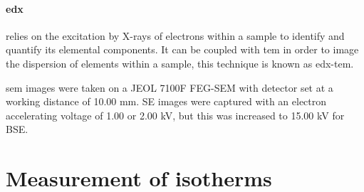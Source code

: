 \paragraph{\acrfull{edx}} relies on the excitation by X-rays of electrons within a sample to identify and quantify its elemental components. It can be coupled with \acrshort{tem} in order to image the dispersion of elements within a sample, this technique is known as \acrshort{edx}-\acrshort{tem}.\citep{Goldstein2017Scanning}

\par \acrshort{sem} images were taken on a JEOL 7100F FEG-SEM with detector set at a working distance of 10.00 mm. SE images were captured with an electron accelerating voltage of 1.00 or 2.00 kV, but this was increased to 15.00 kV for BSE. %

\section{Measurement of isotherms}\label{ss:porosimetry}

